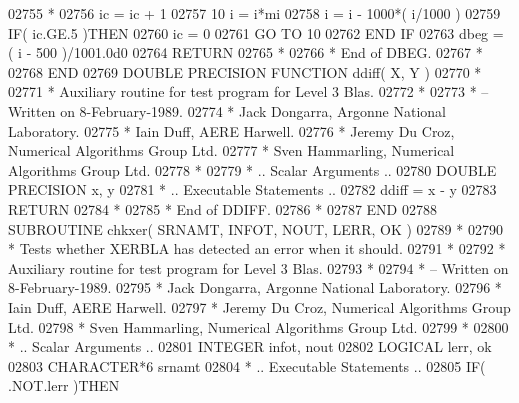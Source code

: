 \begin{DoxyCode}
02755 \textcolor{comment}{*}
02756       ic = ic + 1
02757    10 i = i*mi
02758       i = i - 1000*( i/1000 )
02759       \textcolor{keywordflow}{IF}( ic.GE.5 )\textcolor{keywordflow}{THEN}
02760          ic = 0
02761          \textcolor{keywordflow}{GO TO} 10
02762 \textcolor{keywordflow}{      END IF}
02763       dbeg = ( i - 500 )/1001.0d0
02764       \textcolor{keywordflow}{RETURN}
02765 \textcolor{comment}{*}
02766 \textcolor{comment}{*     End of DBEG.}
02767 \textcolor{comment}{*}
02768 \textcolor{keyword}{      END}
02769 \textcolor{keyword}{      DOUBLE PRECISION }\textcolor{keyword}{FUNCTION }ddiff( X, Y )
02770 \textcolor{comment}{*}
02771 \textcolor{comment}{*  Auxiliary routine for test program for Level 3 Blas.}
02772 \textcolor{comment}{*}
02773 \textcolor{comment}{*  -- Written on 8-February-1989.}
02774 \textcolor{comment}{*     Jack Dongarra, Argonne National Laboratory.}
02775 \textcolor{comment}{*     Iain Duff, AERE Harwell.}
02776 \textcolor{comment}{*     Jeremy Du Croz, Numerical Algorithms Group Ltd.}
02777 \textcolor{comment}{*     Sven Hammarling, Numerical Algorithms Group Ltd.}
02778 \textcolor{comment}{*}
02779 \textcolor{comment}{*     .. Scalar Arguments ..}
02780       \textcolor{keywordtype}{DOUBLE PRECISION}   x, y
02781 \textcolor{comment}{*     .. Executable Statements ..}
02782       ddiff = x - y
02783       \textcolor{keywordflow}{RETURN}
02784 \textcolor{comment}{*}
02785 \textcolor{comment}{*     End of DDIFF.}
02786 \textcolor{comment}{*}
02787 \textcolor{keyword}{      END}
02788 \textcolor{keyword}{      SUBROUTINE }chkxer( SRNAMT, INFOT, NOUT, LERR, OK )
02789 \textcolor{comment}{*}
02790 \textcolor{comment}{*  Tests whether XERBLA has detected an error when it should.}
02791 \textcolor{comment}{*}
02792 \textcolor{comment}{*  Auxiliary routine for test program for Level 3 Blas.}
02793 \textcolor{comment}{*}
02794 \textcolor{comment}{*  -- Written on 8-February-1989.}
02795 \textcolor{comment}{*     Jack Dongarra, Argonne National Laboratory.}
02796 \textcolor{comment}{*     Iain Duff, AERE Harwell.}
02797 \textcolor{comment}{*     Jeremy Du Croz, Numerical Algorithms Group Ltd.}
02798 \textcolor{comment}{*     Sven Hammarling, Numerical Algorithms Group Ltd.}
02799 \textcolor{comment}{*}
02800 \textcolor{comment}{*     .. Scalar Arguments ..}
02801       \textcolor{keywordtype}{INTEGER}            infot, nout
02802       \textcolor{keywordtype}{LOGICAL}            lerr, ok
02803       \textcolor{keywordtype}{CHARACTER*6}        srnamt
02804 \textcolor{comment}{*     .. Executable Statements ..}
02805       \textcolor{keywordflow}{IF}( .NOT.lerr )\textcolor{keywordflow}{THEN}

\end{DoxyCode}
